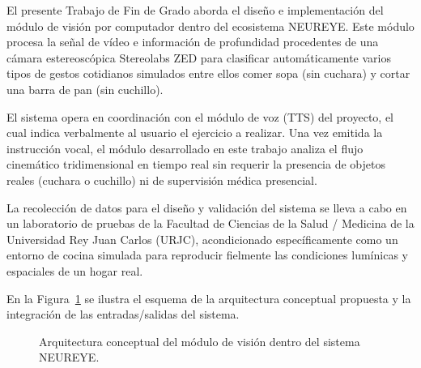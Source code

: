 \documentclass[11pt,a4paper,oneside]{article}
\begin{document}
		El presente Trabajo de Fin de Grado aborda el diseño e implementación del módulo de visión por computador dentro del ecosistema NEUREYE. Este módulo procesa la señal de vídeo e información de profundidad procedentes de una cámara estereoscópica Stereolabs ZED para clasificar automáticamente varios tipos de gestos cotidianos simulados entre ellos comer sopa (sin cuchara) y cortar una barra de pan (sin cuchillo).
		
		El sistema opera en coordinación con el módulo de voz (TTS) del proyecto, el cual indica verbalmente al usuario el ejercicio a realizar. Una vez emitida la instrucción vocal, el módulo desarrollado en este trabajo analiza el flujo cinemático tridimensional en tiempo real sin requerir la presencia de objetos reales (cuchara o cuchillo) ni de supervisión médica presencial.
		
		La recolección de datos para el diseño y validación del sistema se lleva a cabo en un laboratorio de pruebas de la Facultad de Ciencias de la Salud / Medicina de la Universidad Rey Juan Carlos (URJC), acondicionado específicamente como un entorno de cocina simulada para reproducir fielmente las condiciones lumínicas y espaciales de un hogar real.
		
		En la Figura~\ref{fig:arquitectura_sistema} se ilustra el esquema de la arquitectura conceptual propuesta y la integración de las entradas/salidas del sistema.
		
		\begin{figure}[htbp]
			\centering
			\caption{Arquitectura conceptual del módulo de visión dentro del sistema NEUREYE.}
			\label{fig:arquitectura_sistema}
		\end{figure}
		
\end{document}
